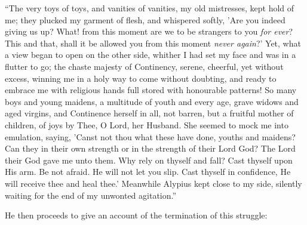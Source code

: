 ``The very toys of toys, and vanities of vanities, my old
mistresses, kept hold of me; they plucked my garment of flesh, and
whispered softly, 'Are you indeed giving us up? What! from this moment
are we to be strangers to you \emph{for ever}? This and that, shall it
be allowed you from this moment \emph{never again}?' Yet, what a view
began to open on the other side, whither I had set my face and was in
a flutter to go; the chaste majesty of Continency, serene, cheerful,
yet without excess, winning me in a holy way to come without doubting,
and ready to embrace me with religious hands full stored with
honourable patterns! So many boys and young maidens, a multitude of
youth and every age, grave widows and aged virgins, and Continence
herself in all, not barren, but a fruitful mother of children, of joys
by Thee, O Lord, her Husband. She seemed to mock me into emulation,
saying, 'Canst not thou what these have done, youths and maidens? Can
they in their own strength or in the strength of their Lord God? The
Lord their God gave me unto them. Why rely on thyself and fall? Cast
thyself upon His arm. Be not afraid. He will not let you slip. Cast
thyself in confidence, He will receive thee and heal thee.' Meanwhile
Alypius kept close to my side, silently waiting for the end of my
unwonted agitation.''

He then proceeds to give an account of the termination of this
struggle:

